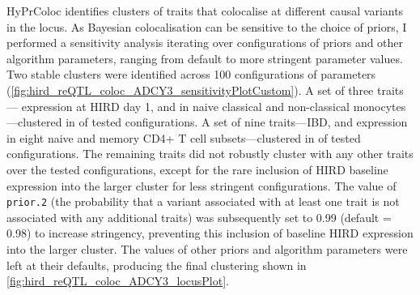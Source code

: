 {HyPrColoc} identifies clusters of traits that colocalise at different causal variants in the locus.
As Bayesian colocalisation can be sensitive to the choice of priors,
I performed a sensitivity analysis iterating over configurations of priors and other algorithm parameters, ranging from default to more stringent parameter values.
Two stable clusters were identified across 100 configurations of parameters (\cref{fig:hird_reQTL_coloc_ADCY3_sensitivityPlotCustom}).
A set of three traits--- expression at \gls{HIRD} day 1, and in naive classical and non-classical monocytes---clustered in  of tested configurations.
A set of nine traits---\gls{IBD}, and expression in eight naive and memory CD4+ T cell subsets---clustered in  of tested configurations.
The remaining traits did not robustly cluster with any other traits over the tested configurations,
except for the rare inclusion of \gls{HIRD} baseline  expression into the larger cluster for less stringent configurations.
%
%
%
%
%
The value of \texttt{prior.2} (the probability that a variant associated with at least one trait is not associated with any additional traits) was subsequently set to 0.99 (default = 0.98) to increase stringency, preventing this inclusion of baseline \gls{HIRD} expression into the larger cluster.
The values of other priors and algorithm parameters were left at their defaults, producing the final clustering shown in \cref{fig:hird_reQTL_coloc_ADCY3_locusPlot}.

